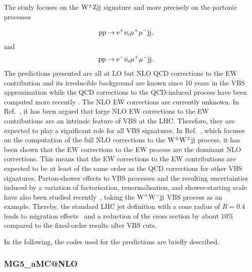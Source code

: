 \documentclass[11pt]{cernrep}
\makeatletter
\newcommand{\MGaMC}{M\protect\scalebox{0.8}{AD}G\protect\scalebox{0.8}{RAPH}5\_aMC@NLO\xspace}
\makeatother
\begin{document}
The study focuses on the ${\rm W}^{\pm}{\rm Z}{\rm j}{\rm j}$ signature and more precisely on the partonic processes

\begin{equation}
 {\rm p} {\rm p} \to {\rm e}^+  \nu_{\rm e}  \mu^+ \mu^- {\rm j} {\rm j} ,
\end{equation}
%
and
%
\begin{equation}
 {\rm p} {\rm p} \to {\rm e}^-  \bar \nu_{\rm e}  \mu^+ \mu^- {\rm j} {\rm j}.
\end{equation}
%
The predictions presented are all at LO but NLO QCD corrections to the EW contribution and its irreducible background are known since 10 years in the VBS approximation \cite{Bozzi:2007ur} while the QCD corrections to the QCD-induced process have been computed more recently \cite{Campanario:2013qba}.
The NLO EW corrections are currently unknown.
In Ref.~\cite{Biedermann:2016yds}, it has been argued that large NLO EW corrections to the EW contributions are an intrinsic feature of VBS at the LHC.
Therefore, they are expected to play a significant role for all VBS signatures.
In Ref.~\cite{Biedermann:2017bss}, which focuses on the computation of the full NLO corrections to the ${\rm W}^\pm{\rm W}^\pm{\rm j}{\rm j}$ process, it has been shown that the EW corrections to the EW process are the dominant NLO corrections.
This means that the EW corrections to the EW contributions are expected to be at least of the same order as the QCD corrections for other VBS signatures.
Parton-shower effects to VBS processes and the resulting uncertainties
induced by a variation of factorisation, renormalisation, and
shower-starting scale have also been studied
recently~\cite{Rauch:2016upa,Rauch:2016pai}, taking the ${\rm W}^+{\rm
W}^-{\rm j}{\rm j}$ VBS process as an example. Thereby, the standard LHC
jet definition with a cone radius of $R{=}0.4$ leads to migration
effects~\cite{Rauch:2017cfu} and a reduction of the cross section by about $10\%$ compared to
the fixed-order results after VBS cuts.

In the following, the codes used for the predictions are briefly described.

\subsubsection*{\protect\MGaMC \label{vbs_mgamc}}
\end{document}
